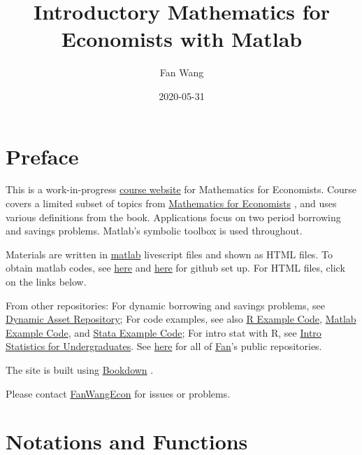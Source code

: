 \documentclass[
]{book}
\title{Introductory Mathematics for Economists with Matlab}
\author{Fan Wang}
\date{2020-05-31}
\begin{document}
\maketitle

{
\hypersetup{linkcolor=}
\setcounter{tocdepth}{1}
\tableofcontents
}
\hypertarget{preface}{%
\chapter*{Preface}\label{preface}}

This is a work-in-progress \href{https://fanwangecon.github.io/Math4Econ/}{course website} for Mathematics for Economists. Course covers a limited subset of topics from \href{Mathematics\%20for\%20Economists}{Mathematics for Economists} \citep{simonblume1994}, and uses various definitions from the book. Applications focus on two period borrowing and savings problems. Matlab's symbolic toolbox is used throughout.

Materials are written in \href{https://www.mathworks.com/products/matlab.html}{matlab} \citep{matlab} livescript files and shown as HTML files. To obtain matlab codes, see \href{docs/gitsetup.md}{here} and \href{docs/gitsetupown.md}{here} for github set up. For HTML files, click on the links below.

From other repositories: For dynamic borrowing and savings problems, see \href{https://fanwangecon.github.io/CodeDynaAsset/}{Dynamic Asset Repository}; For code examples, see also \href{https://fanwangecon.github.io/R4Econ/}{R Example Code}, \href{https://fanwangecon.github.io/M4Econ/}{Matlab Example Code}, and \href{https://fanwangecon.github.io/Stata4Econ/}{Stata Example Code}; For intro stat with R, see \href{https://fanwangecon.github.io/Stat4Econ/}{Intro Statistics for Undergraduates}. See \href{https://github.com/FanWangEcon}{here} for all of \href{https://fanwangecon.github.io/}{Fan}'s public repositories.

The site is built using \href{https://bookdown.org/}{Bookdown} \citep{R-bookdown}.

Please contact \href{https://fanwangecon.github.io/}{FanWangEcon} for issues or problems.

\hypertarget{notations-and-functions}{%
\chapter{Notations and Functions}\label{notations-and-functions}}
\end{document}
